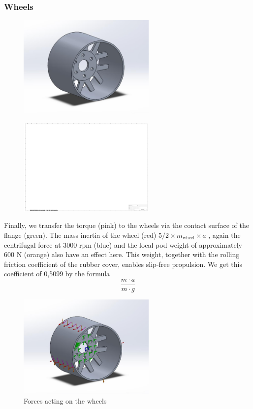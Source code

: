 \subsubsection{Wheels}
\begin{figure}[H]
\centering
\includegraphics[width=0.6\textwidth]{texfiles/mech/eimg/propulsion/picture_wheel}
\caption{}
\label{}
\end{figure}

\begin{figure}[H]
\centering
\includegraphics[width=0.6\textwidth]{texfiles/mech/eimg/propulsion/spaceholder_technical_drawing}
\caption{}
\label{}
\end{figure}

Finally, we transfer the torque (pink) to the wheels via the contact surface of the flange (green). The mass inertia of the wheel (red)
\(5/2 \times m_{\text{wheel}} \times a\)
, again the centrifugal force at 3000 rpm (blue) and the local pod weight of approximately 600 N (orange) also have an effect here. This weight, together with the rolling friction coefficient of the rubber cover, enables slip-free propulsion. We get this coefficient of 0,5099 by the formula
\[
\frac{m \cdot a}{m \cdot g}
\]

\begin{figure}[H]
\centering
\includegraphics[width=0.6\textwidth]{texfiles/mech/eimg/propulsion/picture_forces_wheel}
\caption{Forces acting on the wheels}
\label{fig:wheel_forces}
\end{figure}


